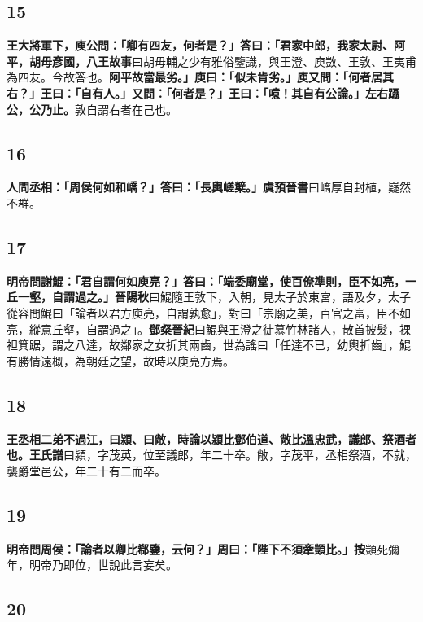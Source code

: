\subsection*{15}

\textbf{王大將軍下，庾公問：「卿有四友，何者是？」答曰：「君家中郎，我家太尉、阿平，胡毋彥國，}{\footnotesize \textbf{八王故事}曰胡毋輔之少有雅俗鑒識，與王澄、庾敳、王敦、王夷甫為四友。今故答也。}\textbf{阿平故當最劣。」庾曰：「似未肯劣。」庾又問：「何者居其右？」王曰：「自有人。」又問：「何者是？」王曰：「噫！其自有公論。」左右躡公，公乃止。}{\footnotesize 敦自謂右者在己也。}

\subsection*{16}

\textbf{人問丞相：「周侯何如和嶠？」答曰：「長輿嵯櫱。」}{\footnotesize \textbf{虞預晉書}曰嶠厚自封植，嶷然不群。}

\subsection*{17}

\textbf{明帝問謝鯤：「君自謂何如庾亮？」答曰：「端委廟堂，使百僚準則，臣不如亮，一丘一壑，自謂過之。」}{\footnotesize \textbf{晉陽秋}曰鯤隨王敦下，入朝，見太子於東宮，語及夕，太子從容問鯤曰「論者以君方庾亮，自謂孰愈」，對曰「宗廟之美，百官之富，臣不如亮，縱意丘壑，自謂過之」。\textbf{鄧粲晉紀}曰鯤與王澄之徒慕竹林諸人，散首披髮，裸袒箕踞，謂之八達，故鄰家之女折其兩齒，世為謠曰「任達不已，幼輿折齒」，鯤有勝情遠概，為朝廷之望，故時以庾亮方焉。}

\subsection*{18}

\textbf{王丞相二弟不過江，曰潁、曰敞，時論以潁比鄧伯道、敞比溫忠武，議郎、祭酒者也。}{\footnotesize \textbf{王氏譜}曰潁，字茂英，位至議郎，年二十卒。敞，字茂平，丞相祭酒，不就，襲爵堂邑公，年二十有二而卒。}

\subsection*{19}

\textbf{明帝問周侯：「論者以卿比郗鑒，云何？」周曰：「陛下不須牽顗比。」}{\footnotesize \textbf{按}顗死彌年，明帝乃即位，世說此言妄矣。}

\subsection*{20}

